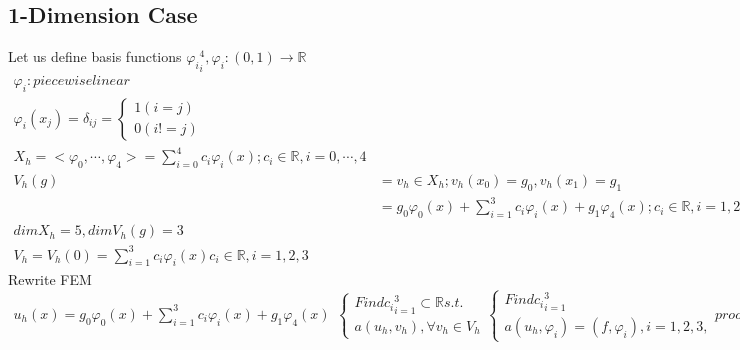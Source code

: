 \documentclass[a4paper,12pt]{article}
\newcommand{\R}{\mathbb{R}}
\begin{document}
\subsection{1-Dimension Case}
Let us define basis functions ${\varphi_i}_i^4,\varphi_i:(0,1)\rightarrow \R$
\begin{equation}\nonumber
\begin{aligned}
\varphi_i : piecewise linear\\
\varphi_i(x_j) = \delta_{ij}=\begin{cases}
1 (i=j)\\
0 (i!=j)
\end{cases}\\
X_h = {<\varphi_0,\cdots,\varphi_4> = {\sum_{i=0}^{4}}c_i\varphi_i(x);c_i \in \R, i=0,\cdots, 4}\\
V_h(g) &= {v_h\in X_h;v_h(x_0) = g_0, v_h(x_1)=g_1}\\
&= {g_0 \varphi_0(x) + \sum_{i=1}^{3}c_i\varphi_i(x) + g_1\varphi_4(x);c_i\in\R, i = 1,2,3}\\
dim X_h = 5, dim V_h(g) = 3\\
V_h = V_h(0)={\sum_{i=1}^{3}c_i\varphi_i(x)c_i\in\R, i = 1,2,3}
\end{aligned}
\end{equation}
Rewrite FEM
\begin{equation}\nonumber
\begin{aligned}
u_h(x) = g_0 \varphi_0(x) + \sum_{i=1}^{3}c_i\varphi_i(x) + g_1\varphi_4(x)
\end{aligned}
\begin{cases}
Find {c_i}_{i=1}^3 \subset \R s.t.\\
a(u_h,v_h), \forall v_h\in V_h
\end{cases}
\begin{cases}
Find {c_i}_{i=1}^3\\
a(u_h,\varphi_i) = (f,\varphi_i), i = 1,2,3,
\end{cases}
proof the equality
\end{equation}
\end{document}
